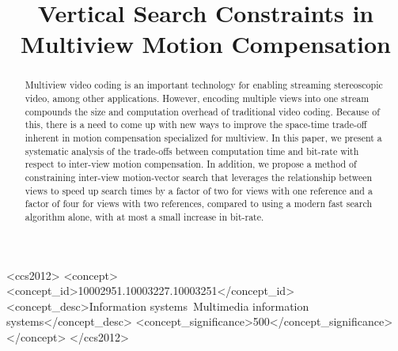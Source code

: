 \documentclass{sig-alternate-05-2015}
\begin{document}

\title{Vertical Search Constraints in Multiview Motion Compensation}
\author{
\alignauthor
}

\maketitle

\begin{abstract}
Multiview video coding is an important technology for enabling streaming
stereoscopic video, among other applications. However, encoding multiple
views into one stream compounds the size and computation overhead of
traditional video coding. Because of this, there is a need to come up with new
ways to improve the space-time trade-off inherent in motion compensation
specialized for multiview. In this paper, we present a systematic analysis of
the trade-offs between computation time and bit-rate with respect to inter-view
motion compensation. In addition, we propose a method of constraining inter-view
motion-vector search that leverages the relationship between views to speed up
search times by a factor of two for views with one reference and a factor of
four for views with two references, compared to using a modern fast search
algorithm alone, with at most a small increase in bit-rate.
\end{abstract}

\begin{CCSXML}
<ccs2012>
<concept>
<concept_id>10002951.10003227.10003251</concept_id>
<concept_desc>Information systems~Multimedia information systems</concept_desc>
<concept_significance>500</concept_significance>
</concept>
</ccs2012>
\end{CCSXML}
\printccsdesc

\end{document}
